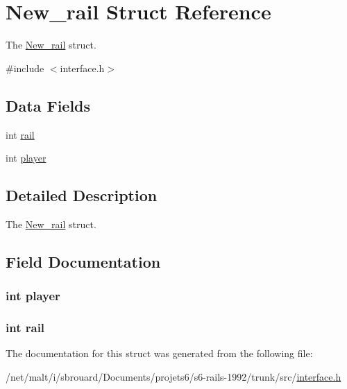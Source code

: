 \hypertarget{structNew__rail}{\section{New\-\_\-rail Struct Reference}
\label{structNew__rail}
}


The \hyperlink{structNew__rail}{New\-\_\-rail} struct.  




{\ttfamily \#include $<$interface.\-h$>$}

\subsection*{Data Fields}
\begin{DoxyCompactItemize}
\item 
int \hyperlink{structNew__rail_a1017757e6fb62c1e1415b8663a5fc128}{rail}
\item 
int \hyperlink{structNew__rail_ae78f447e0fc84c538b91b0cc8c8a34fa}{player}
\end{DoxyCompactItemize}


\subsection{Detailed Description}
The \hyperlink{structNew__rail}{New\-\_\-rail} struct. 

\subsection{Field Documentation}
\hypertarget{structNew__rail_ae78f447e0fc84c538b91b0cc8c8a34fa}{
\subsubsection[{player}]{\setlength{\rightskip}{0pt plus 5cm}int player}}\label{structNew__rail_ae78f447e0fc84c538b91b0cc8c8a34fa}
\hypertarget{structNew__rail_a1017757e6fb62c1e1415b8663a5fc128}{
\subsubsection[{rail}]{\setlength{\rightskip}{0pt plus 5cm}int rail}}\label{structNew__rail_a1017757e6fb62c1e1415b8663a5fc128}


The documentation for this struct was generated from the following file\-:\begin{DoxyCompactItemize}
\item 
/net/malt/i/sbrouard/\-Documents/projets6/s6-\/rails-\/1992/trunk/src/\hyperlink{interface_8h}{interface.\-h}\end{DoxyCompactItemize}
